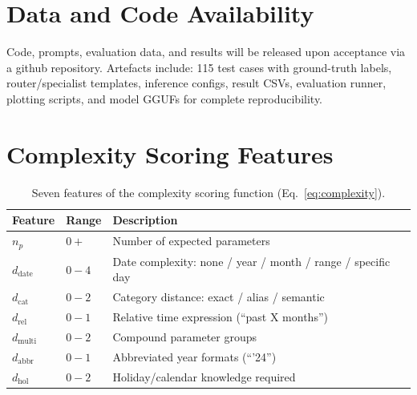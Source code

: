 \documentclass[11pt,twocolumn]{article}
\begin{document}
\vspace{-4pt}
\section*{Data and Code Availability}
\vspace{-2pt}

Code, prompts, evaluation data, and results will be released upon acceptance via a github repository.
Artefacts include: 115 test cases with ground-truth labels, router/specialist templates, inference configs, result CSVs, evaluation runner, plotting scripts, and model GGUFs for complete reproducibility.

\clearpage


\appendix\onecolumn

\section{Complexity Scoring Features}
\label{sec:complexity_appendix}

\begin{table}[h]
\centering
\small
\begin{tabular}{@{}llp{4.5cm}@{}}
\toprule
\textbf{Feature} & \textbf{Range} & \textbf{Description} \\
\midrule
$n_p$              & $0{+}$    & Number of expected parameters \\
$d_{\text{date}}$  & $0{-}4$   & Date complexity: none / year / month / range / specific day \\
$d_{\text{cat}}$   & $0{-}2$   & Category distance: exact / alias / semantic \\
$d_{\text{rel}}$   & $0{-}1$   & Relative time expression (``past X months'') \\
$d_{\text{multi}}$ & $0{-}2$   & Compound parameter groups \\
$d_{\text{abbr}}$  & $0{-}1$   & Abbreviated year formats (``'24'') \\
$d_{\text{hol}}$   & $0{-}2$   & Holiday/calendar knowledge required \\
\bottomrule
\end{tabular}
\caption{Seven features of the complexity scoring function
(Eq.~\ref{eq:complexity}).}
\label{tab:complexity_features}
\end{table}
\end{document}
